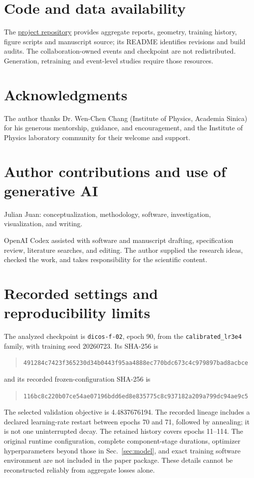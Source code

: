 \documentclass[11pt]{article}
\begin{document}
\section*{Code and data availability}

The \href{https://github.com/JulianAttemptsCoding/fast-mc-paper}{project repository} provides aggregate reports, geometry, training history, figure scripts and manuscript source; its README identifies revisions and build audits. The collaboration-owned events and checkpoint are not redistributed. Generation, retraining and event-level studies require those resources.

\section*{Acknowledgments}

The author thanks Dr. Wen-Chen Chang (Institute of Physics, Academia Sinica) for his generous mentorship, guidance, and encouragement, and the Institute of Physics laboratory community for their welcome and support.

\section*{Author contributions and use of generative AI}

Julian Juan: conceptualization, methodology, software, investigation, visualization, and writing.

OpenAI Codex assisted with software and manuscript drafting, specification review, literature searches, and editing. The author supplied the research ideas, checked the work, and takes responsibility for the scientific content.


\clearpage
\appendix
\section{Recorded settings and reproducibility limits}
\label{app:reproducibility}

The analyzed checkpoint is \texttt{dicos-f-02}, epoch 90, from the \texttt{calibrated\_lr3e4} family, with training seed 20260723. Its SHA-256 is
\begin{quote}\footnotesize\nolinkurl{491284c7423f365230d34b0443f95aa4888ec770bdc673c4c979897bad8acbce}\end{quote}
and its recorded frozen-configuration SHA-256 is
\begin{quote}\footnotesize\nolinkurl{116bc8c220b07ce54ae07196bdd6ed8e835775c8c937182a209a799dc94ae9c5}\end{quote}
The selected validation objective is 4.4837676194. The recorded lineage includes a declared learning-rate restart between epochs 70 and 71, followed by annealing; it is not one uninterrupted decay. The retained history covers epochs 11--114. The original runtime configuration, complete component-stage durations, optimizer hyperparameters beyond those in Sec.~\ref{sec:model}, and exact training software environment are not included in the paper package. These details cannot be reconstructed reliably from aggregate losses alone.
\end{document}

